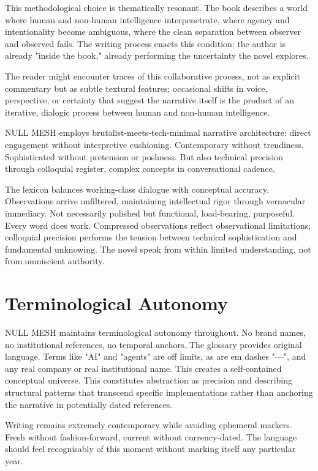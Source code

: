 This methodological choice is thematically resonant. The book describes a world where human and non-human intelligence interpenetrate, where agency and intentionality become ambiguous, where the clean separation between observer and observed fails. The writing process enacts this condition: the author is already "inside the book," already performing the uncertainty the novel explores.

The reader might encounter traces of this collaborative process, not as explicit commentary but as subtle textural features; occasional shifts in voice, perspective, or certainty that suggest the narrative itself is the product of an iterative, dialogic process between human and non-human intelligence.

NULL MESH employs brutalist-meets-tech-minimal narrative architecture: direct engagement without interpretive cushioning. Contemporary without trendiness. Sophisticated without pretension or poshness. But also technical precision through colloquial register, complex concepts in conversational cadence.

The lexicon balances working-class dialogue with conceptual accuracy. Observations arrive unfiltered, maintaining intellectual rigor through vernacular immediacy. Not necessarily polished but functional, load-bearing, purposeful. Every word does work. Compressed observations reflect observational limitations; colloquial precision performs the tension between technical sophistication and fundamental unknowing. The novel speak from within limited understanding, not from omniscient authority.

\section*{Terminological Autonomy}

NULL MESH maintains terminological autonomy throughout. No brand names, no institutional references, no temporal anchors. The glossary provides original language. Terms like "AI" and "agents" are off limits, as are em dashes "—", and any real company or real institutional name. This creates a self-contained conceptual universe. This constitutes abstraction as precision and describing structural patterns that transcend specific implementations rather than anchoring the narrative in potentially dated references.

Writing remains extremely contemporary while avoiding ephemeral markers. Fresh without fashion-forward, current without currency-dated. The language should feel recognisably of this moment without marking itself any particular year.


